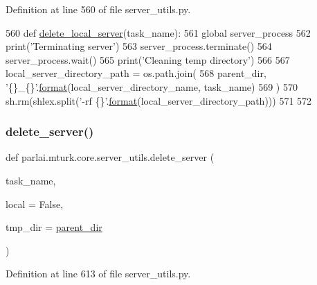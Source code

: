 Definition at line 560 of file server\+\_\+utils.\+py.


\begin{DoxyCode}
560 \textcolor{keyword}{def }\hyperlink{namespaceparlai_1_1mturk_1_1core_1_1server__utils_a9b4f4c3f696be001c2fa96b3690af83c}{delete\_local\_server}(task\_name):
561     \textcolor{keyword}{global} server\_process
562     print(\textcolor{stringliteral}{'Terminating server'})
563     server\_process.terminate()
564     server\_process.wait()
565     print(\textcolor{stringliteral}{'Cleaning temp directory'})
566 
567     local\_server\_directory\_path = os.path.join(
568         parent\_dir, \textcolor{stringliteral}{'\{\}\_\{\}'}.\hyperlink{namespaceparlai_1_1chat__service_1_1services_1_1messenger_1_1shared__utils_a32e2e2022b824fbaf80c747160b52a76}{format}(local\_server\_directory\_name, task\_name)
569     )
570     sh.rm(shlex.split(\textcolor{stringliteral}{'-rf \{\}'}.\hyperlink{namespaceparlai_1_1chat__service_1_1services_1_1messenger_1_1shared__utils_a32e2e2022b824fbaf80c747160b52a76}{format}(local\_server\_directory\_path)))
571 
572 
\end{DoxyCode}
\mbox{\label{namespaceparlai_1_1mturk_1_1core_1_1server__utils_a3c7c1d82bd4d26eb98ce9711de3cca7c}} 
\subsubsection{\texorpdfstring{delete\+\_\+server()}{delete\_server()}}
{\footnotesize\ttfamily def parlai.\+mturk.\+core.\+server\+\_\+utils.\+delete\+\_\+server (\begin{DoxyParamCaption}\item[{}]{task\+\_\+name,  }\item[{}]{local = {\ttfamily False},  }\item[{}]{tmp\+\_\+dir = {\ttfamily \hyperlink{namespaceparlai_1_1mturk_1_1core_1_1server__utils_a193439bdbc25a32b00f1a43e6f8532d8}{parent\+\_\+dir}} }\end{DoxyParamCaption})}



Definition at line 613 of file server\+\_\+utils.\+py.


